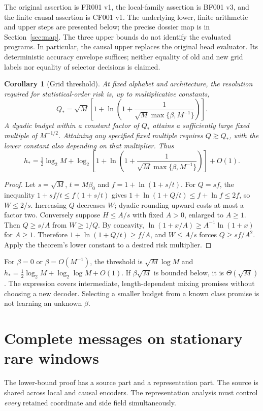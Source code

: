 \documentclass[11pt,letterpaper]{article}
\newtheorem{corollary}[theorem]{Corollary}
\theoremstyle{definition}\newtheorem{definition}[theorem]{Definition}
\theoremstyle{remark}\newtheorem{remark}[theorem]{Remark}
\newcommand{\betaz}{\beta_0}
\newcommand{\unit}[1]{\textsf{#1}}
\begin{document}
The original assertion is \unit{FR001 v1}, the local-family assertion is \unit{BF001 v3}, and the finite causal assertion is \unit{CF001 v1}. The underlying lower, finite arithmetic and upper steps are presented below; the precise dossier map is in Section~\ref{sec:map}. The three upper bounds do not identify the evaluated programs. In particular, the causal upper replaces the original head evaluator. Its deterministic accuracy envelope suffices; neither equality of old and new grid labels nor equality of selector decisions is claimed.

\begin{corollary}[Grid threshold]\label{cor:threshold}
At fixed alphabet and architecture, the resolution required for statistical-order risk is, up to multiplicative constants,
\begin{equation}\label{eq:qstar}
 Q_* =\sqrt M\left[1+\ln\left(1+\frac1{\sqrt M\max\{\beta,M^{-1}\}}\right)\right].
\end{equation}
A dyadic budget within a constant factor of $Q_*$ attains a sufficiently large fixed multiple of $M^{-1/2}$. Attaining any specified fixed multiple requires $Q\gtrsim Q_*$, with the lower constant also depending on that multiplier. Thus
\[
 h_* =\tfrac12\log_2M+
 \log_2\left[1+\ln\left(1+\frac1{\sqrt M\max\{\beta,M^{-1}\}}\right)\right]+O(1).
\]
\end{corollary}
\begin{proof}
Let $s=\sqrt M$, $t=M\betaz$ and $f=1+\ln(1+s/t)$. For $Q=sf$, the inequality $1+sf/t\le f(1+s/t)$ gives $1+\ln(1+Q/t)\le f+\ln f\le2f$, so $W\le2/s$. Increasing $Q$ decreases $W$; dyadic rounding upward costs at most a factor two.
Conversely suppose $H\le A/s$ with fixed $A>0$, enlarged to $A\ge1$. Then $Q\ge s/A$ from $W\ge1/Q$. By concavity, $\ln(1+x/A)\ge A^{-1}\ln(1+x)$ for $A\ge1$. Therefore $1+\ln(1+Q/t)\ge f/A$, and $W\le A/s$ forces $Q\ge sf/A^2$. Apply the theorem's lower constant to a desired risk multiplier.
\end{proof}

For $\beta=0$ or $\beta=O(M^{-1})$, the threshold is $\sqrt M\log M$ and $h_*=\frac12\log_2M+\log_2\log M+O(1)$. If $\beta\sqrt M$ is bounded below, it is $\Theta(\sqrt M)$. The expression covers intermediate, length-dependent mixing promises without choosing a new decoder. Selecting a smaller budget from a known class promise is not learning an unknown $\beta$.

\section{Complete messages on stationary rare windows}\label{sec:lower}
The lower-bound proof has a source part and a representation part. The source is shared across local and causal encoders. The representation analysis must control \emph{every} retained coordinate and side field simultaneously.
\end{document}
